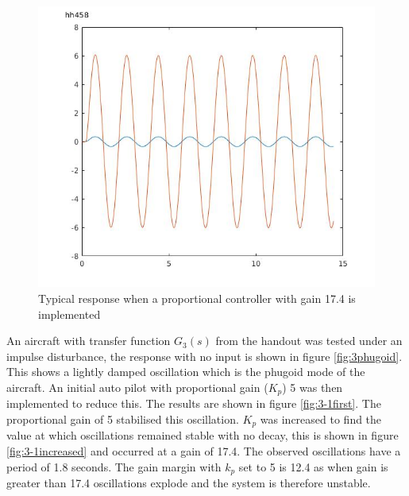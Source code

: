 \documentclass[twoside,twocolumn]{article}
\begin{document}
\begin{figure}[h]
  \centering
    \includegraphics[width=\linewidth]{3_kp=17-4}
  \caption{Typical response when a proportional controller with gain 17.4 is implemented}
  \label{fig:3kp17-4}
\end{figure}

An aircraft with transfer function $G_3(s)$ from the handout was tested under an impulse disturbance, the response with no input is shown in figure \ref{fig:3phugoid}. This shows a lightly damped oscillation which is the phugoid mode of the aircraft. An initial auto pilot with proportional gain ($K_p$) 5 was then implemented to reduce this. The results are shown in figure \ref{fig:3-1first}. The proportional gain of 5 stabilised this oscillation. $K_p$ was increased to find the value at which oscillations remained stable with no decay, this is shown in figure \ref{fig:3-1increased} and occurred at a gain of 17.4. The observed oscillations have a period of 1.8 seconds. The gain margin with $k_p$ set to 5 is 12.4 as when gain is greater than 17.4 oscillations explode and the system is therefore unstable.
\end{document}
